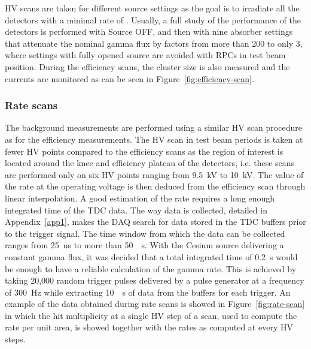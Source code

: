 	HV scans are taken for different source settings as the goal is to irradiate all the detectors with a minimal rate of . Usually, a full study of the performance of the detectors is performed with Source OFF, and then with nine absorber settings that attenuate the nominal gamma flux by factors from more than 200 to only 3, where settings with fully opened source are avoided with RPCs in test beam position. During the efficiency scans, the cluster size is also measured and the currents are monitored as can be seen in Figure~\ref{fig:efficiency-scan}.
	
\endgroup
	
		\subsubsection{Rate scans}
		\label{chapt5:sssec:ratescan}
		
	The background measurements are performed using a similar HV scan procedure as for the efficiency measurements. The HV scan in test beam periods is taken at fewer HV points compared to the efficiency scans as the region of interest is located around the knee and efficiency plateau of the detectors, i.e. these scans are performed only on six HV points ranging from \SI{9.5}{kV} to \SI{10}{kV}. The value of the rate at the operating voltage is then deduced from the efficiency scan through linear interpolation. A good estimation of the rate requires a long enough integrated time of the TDC data. The way data is collected, detailed in Appendix~\ref{app1}, makes the DAQ search for data stored in the TDC buffers prior to the trigger signal. The time window from which the data can be collected ranges from \SI{25}{ns} to more than \SI{50}{\mu s}. With the Cesium source delivering a constant gamma flux, it was decided that a total integrated time of \SI{0.2}{s} would be enough to have a reliable calculation of the gamma rate. This is achieved by taking 20,000 random trigger pulses delivered by a pulse generator at a frequency of \SI{300}{Hz} while extracting \SI{10}{\mu s} of data from the buffers for each trigger. An example of the data obtained during rate scans is showed in Figure~\ref{fig:rate-scan} in which the hit multiplicity at a single HV step of a scan, used to compute the rate per unit area, is showed together with the rates as computed at every HV steps.
	
